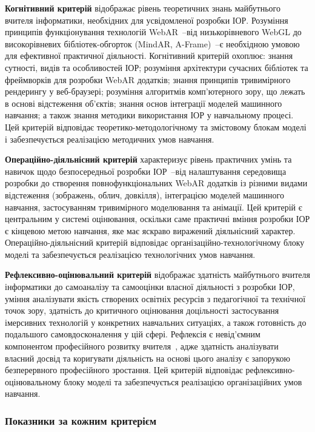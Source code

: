 \textbf{Когнітивний критерій} відображає рівень теоретичних знань майбутнього вчителя інформатики, необхідних для усвідомленої розробки ІОР. Розуміння принципів функціонування технологій WebAR~--від низькорівневого WebGL до високорівневих бібліотек-обгорток (MindAR, A-Frame)~--є необхідною умовою для ефективної практичної діяльності. Когнітивний критерій охоплює: знання сутності, видів та особливостей ІОР; розуміння архітектури сучасних бібліотек та фреймворків для розробки WebAR додатків; знання принципів тривимірного рендерингу у веб-браузері; розуміння алгоритмів комп'ютерного зору, що лежать в основі відстеження об'єктів; знання основ інтеграції моделей машинного навчання; а також знання методики використання ІОР у навчальному процесі. Цей критерій відповідає теоретико-методологічному та змістовому блокам моделі і забезпечується реалізацією методичних умов навчання.

\textbf{Операційно-діяльнісний критерій} характеризує рівень практичних умінь та навичок щодо безпосередньої розробки ІОР~--від налаштування середовища розробки до створення повнофункціональних WebAR додатків із різними видами відстеження (зображень, облич, довкілля), інтеграцією моделей машинного навчання, застосуванням тривимірного моделювання та анімації. Цей критерій є центральним у системі оцінювання, оскільки саме практичні вміння розробки ІОР є кінцевою метою навчання, яке має яскраво виражений діяльнісний характер. Операційно-діяльнісний критерій відповідає організаційно-технологічному блоку моделі та забезпечується реалізацією технологічних умов навчання.

\textbf{Рефлексивно-оцінювальний критерій} відображає здатність майбутнього вчителя інформатики до самоаналізу та самооцінки власної діяльності з розробки ІОР, уміння аналізувати якість створених освітніх ресурсів з педагогічної та технічної точок зору, здатність до критичного оцінювання доцільності застосування імерсивних технологій у конкретних навчальних ситуаціях, а також готовність до подальшого самовдосконалення у цій сфері. Рефлексія є невід'ємним компонентом професійного розвитку вчителя~\cite{ReflexiveApproach2018}, адже здатність аналізувати власний досвід та коригувати діяльність на основі цього аналізу є запорукою безперервного професійного зростання. Цей критерій відповідає рефлексивно-оцінювальному блоку моделі та забезпечується реалізацією організаційних умов навчання.

\subsubsection{Показники за кожним критерієм}

